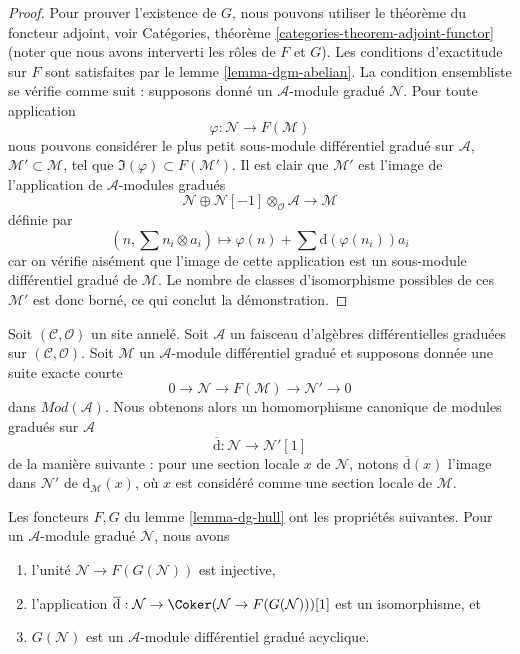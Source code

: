 \begin{proof}
Pour prouver l'existence de $G$, nous pouvons utiliser le théorème du foncteur adjoint, voir Catégories, théorème \ref{categories-theorem-adjoint-functor} (noter que nous avons interverti les rôles de $F$ et $G$).
Les conditions d'exactitude sur $F$ sont satisfaites par le lemme \ref{lemma-dgm-abelian}.
La condition ensembliste se vérifie comme suit : supposons donné un $\mathcal{A}$-module gradué $\mathcal{N}$.
Pour toute application
$$
\varphi : \mathcal{N} \longrightarrow F(\mathcal{M})
$$
nous pouvons considérer le plus petit sous-module différentiel gradué sur $\mathcal{A}$, $\mathcal{M}' \subset \mathcal{M}$, tel que $\Im(\varphi) \subset F(\mathcal{M}')$.
Il est clair que $\mathcal{M}'$ est l'image de l'application de $\mathcal{A}$-modules gradués
$$
\mathcal{N} \oplus
\mathcal{N}[-1] \otimes_\mathcal{O} \mathcal{A}
\longrightarrow
\mathcal{M}
$$
définie par
$$
(n, \sum n_i \otimes a_i) \longmapsto
\varphi(n) + \sum \text{d}(\varphi(n_i)) a_i
$$
car on vérifie aisément que l'image de cette application est un sous-module différentiel gradué de $\mathcal{M}$.
Le nombre de classes d'isomorphisme possibles de ces $\mathcal{M}'$ est donc borné, ce qui conclut la démonstration.
\end{proof}

\noindent
Soit $(\mathcal{C}, \mathcal{O})$ un site annelé.
Soit $\mathcal{A}$ un faisceau d'algèbres différentielles graduées sur $(\mathcal{C}, \mathcal{O})$.
Soit $\mathcal{M}$ un $\mathcal{A}$-module différentiel gradué et supposons donnée une suite exacte courte
$$
0 \to \mathcal{N} \to F(\mathcal{M}) \to \mathcal{N}' \to 0
$$
dans $\textit{Mod}(\mathcal{A})$.
Nous obtenons alors un homomorphisme canonique de modules gradués sur $\mathcal{A}$
$$
\overline{\text{d}} : \mathcal{N} \to \mathcal{N}'[1]
$$
de la manière suivante : pour une section locale $x$ de $\mathcal{N}$, notons $\overline{\text{d}}(x)$ l'image dans $\mathcal{N}'$ de $\text{d}_\mathcal{M}(x)$, où $x$ est considéré comme une section locale de $\mathcal{M}$.

\begin{lemma}
\label{lemma-dg-hull-acyclic}
Les foncteurs $F, G$ du lemme \ref{lemma-dg-hull}  ont les propriétés suivantes.
Pour un $\mathcal{A}$-module gradué $\mathcal{N}$, nous avons
\begin{enumerate}
\item l'unité $\mathcal{N} \to F(G(\mathcal{N}))$ est injective, \item l'application $\overline{\text{d}} : \mathcal{N} \to \Coker(\mathcal{N} \to F(G(\mathcal{N})))[1]$ est un isomorphisme, et \item $G(\mathcal{N})$ est un $\mathcal{A}$-module différentiel gradué acyclique.
\end{enumerate}
\end{lemma}

